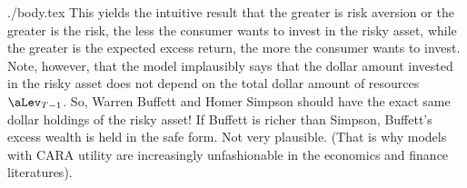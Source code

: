 \documentclass{handout}
\begin{document}
\begin{verbatimwrite}{./body.tex}
This yields the intuitive result that the greater is risk aversion or
the greater is the risk, the less the consumer wants to invest in the
risky asset, while the greater is the expected excess return, the more
the consumer wants to invest.  Note, however, that the model
implausibly says that the dollar amount invested in the risky asset
does not depend on the total dollar amount of resources $\aLev_{T-1}$.
So, Warren Buffett and Homer Simpson should have the exact same dollar
holdings of the risky asset!  If Buffett is richer than Simpson, Buffett's 
excess wealth is held in the safe form.  Not very plausible.  (That is why
models with CARA utility are increasingly unfashionable in the economics and finance literatures).

\end{verbatimwrite} 



\end{document}
